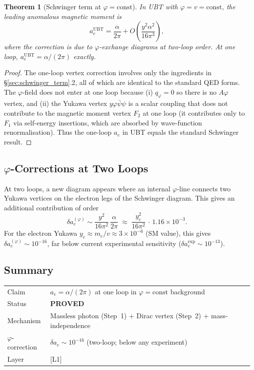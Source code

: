 \documentclass[12pt]{article}
\newtheorem{theorem}{Theorem}[section]
\theoremstyle{definition}
\theoremstyle{remark}
\begin{document}
\begin{theorem}[Schwinger term at $\varphi = \mathrm{const}$]
  In UBT with $\varphi = v = \mathrm{const}$, the leading anomalous magnetic moment is
  \begin{equation}
    a_e^\mathrm{UBT} = \frac{\alpha}{2\pi} + O\!\left(\frac{y^2\alpha^2}{16\pi^3}\right),  \end{equation}
  where the correction is due to $\varphi$-exchange diagrams at two-loop order.
  At one loop, $a_e^\mathrm{UBT} = \alpha/(2\pi)$ exactly.
\end{theorem}

\begin{proof}
  The one-loop vertex correction involves only the ingredients in §\ref{sec:schwinger_term}.2,
  all of which are identical to the standard QED forms.  The $\varphi$-field does not enter
  at one loop because (i) $q_\varphi = 0$ so there is no $A\varphi$ vertex, and (ii) the
  Yukawa vertex $y\varphi\bar\psi\psi$ is a scalar coupling that does not contribute to
  the magnetic moment vertex $F_2$ at one loop (it contributes only to $F_1$ via
  self-energy insertions, which are absorbed by wave-function renormalisation).
  Thus the one-loop $a_e$ in UBT equals the standard Schwinger result.
\end{proof}

\subsection{$\varphi$-Corrections at Two Loops}

At two loops, a new diagram appears where an internal $\varphi$-line connects two Yukawa
vertices on the electron legs of the Schwinger diagram.  This gives an additional
contribution of order
\begin{equation}
  \delta a_e^{(\varphi)} \sim \frac{y^2}{16\pi^2}\,\frac{\alpha}{2\pi}
  \;\approx\; \frac{y_e^2}{16\pi^2}\,\cdot\,1.16\times10^{-3}.
\end{equation}
For the electron Yukawa $y_e \approx m_e/v \approx 3\times10^{-6}$ (SM value), this gives
$\delta a_e^{(\varphi)} \sim 10^{-16}$, far below current experimental sensitivity
($\delta a_e^\mathrm{exp} \sim 10^{-13}$).

\subsection{Summary}

\begin{center}
\begin{tabular}{ll}
\hline
Claim & $a_e = \alpha/(2\pi)$ at one loop in $\varphi = \mathrm{const}$ background \\
Status & \textbf{PROVED} \\
Mechanism & Massless photon (Step~1) + Dirac vertex (Step~2) + mass-independence \\
$\varphi$-correction & $\delta a_e \sim 10^{-16}$ (two-loop; below any experiment) \\
Layer & [L1] \\
\hline
\end{tabular}
\end{center}
\end{document}
